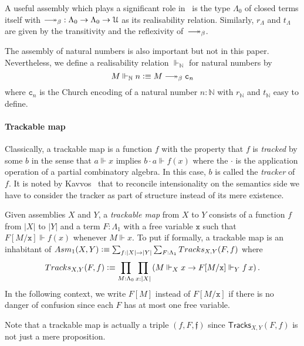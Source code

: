 \documentclass[a4paper,UKenglish,numberwithinsect,cleveref,thm-restate]{lipics-v2021}
\newcommand{\Nat}{\mathbb{N}}
\newcommand{\Asm}{\mathsf{Asm}}
\newcommand{\defeq}{\vcentcolon\equiv}
\newcommand{\Univ}{\mathcal{U}}
\DeclareRobustCommand\longtwoheadrightarrow{\relbar\joinrel\twoheadrightarrow}
\newcommand{\reduce}{\longtwoheadrightarrow_{\beta}}
\theoremstyle{plain}
\begin{document}
\begin{example}\label{ex:assembly-lambda}
  A useful assembly which plays a significant role in~ is the type $\Lambda_0$ of closed terms itself with ${\reduce} : \Lambda_0 \to \Lambda_0 \to \Univ$ as its realisability relation.
  Similarly, $r_\Lambda$ and $t_\Lambda$ are given by the transitivity and the reflexivity of~$\reduce$.
  
\end{example}

\begin{example}
  The assembly of natural numbers is also important but not in this paper.
  Nevertheless, we define a realisability relation $\Vdash_{\Nat}$ for natural numbers by
  \[
    M \Vdash_\Nat n \defeq M \reduce \mathtt{c}_n
  \]
  where $\mathtt{c}_n$ is the Church encoding of a natural number $n : \Nat$ with $r_\Nat$ and $t_\Nat$ easy to define. 
\end{example}

\paragraph*{Trackable map}%
Classically, a trackable map is a function $f$ with the property that $f$ is \emph{tracked} by some $b$ in the sense that $a \Vdash x$ implies $b \cdot a \Vdash f(x)$ where the $\cdot$ is the application operation of a partial combinatory algebra. In this case, $b$ is called the \emph{tracker} of $f$.
It is noted by Kavvos~\cite{Kavvos2017b} that to reconcile intensionality on the semantics side we have to consider the tracker as part of structure instead of its mere existence.
\begin{definition}\label{def:trackable}
  Given assemblies $X$ and $Y$, a \emph{trackable map} from $X$ to $Y$ consists of a function $f$ from $|X|$ to $|Y|$ and a term $F : \Lambda_1$ with a free variable $\mathtt{x}$ such that $F[M/\mathtt{x}] \Vdash f(x)$ whenever $M \Vdash x$.
  To put if formally, a trackable map is an inhabitant of $\Asm_1(X, Y) \defeq \sum_{f : |X| \to |Y|} \sum_{F : \Lambda_1} \mathsf{Tracks}_{X, Y}(F, f)$ where
  \[
    \mathsf{Tracks}_{X, Y}(F, f) \defeq \prod_{M : \Lambda_0} \prod_{x : |X|}
    \left( M \Vdash_X x \to F[M/\mathtt{x}] \Vdash_Y f\, x \right).
  \]
  In the following context, we write $F[M]$ instead of $F[M/\mathtt{x}]$ if there is no danger of confusion since each $F$ has at most one free variable.
\end{definition}
Note that a trackable map is actually a triple $(f, F, \mathfrak{f})$ since $\mathsf{Tracks}_{X, Y}(F, f)$ is not just a mere proposition.
\end{document}
